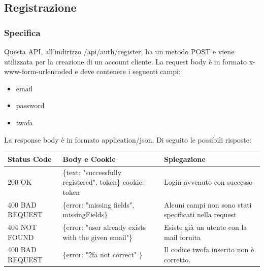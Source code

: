 \documentclass{report}
\begin{document}
\subsection{Registrazione}
\subsubsection*{Specifica}
Questa API, all'indirizzo /api/auth/register, ha un metodo POST e viene utilizzata per la creazione di un account cliente.
La request body è in formato x-www-form-urlencoded e deve contenere i seguenti campi:
\begin{itemize}
	\item email
	\item password
	\item twofa
\end{itemize}
La response body è in formato application/json. Di seguito le possibili risposte:
\begin{center} %
	\centering
	\begin{tabular}{ |p{4cm}|p{5cm}|p{4cm}| }
		\hline
		\centering Status Code & \qquad\quad Body e Cookie                                & \qquad\qquad Spiegazione                              \\ %
		\hline
		200 OK                 & \{text: "successfully registered", token\} cookie: token & Login avvenuto con successo                           \\
		\hline
		400 BAD REQUEST        & \{error: "missing fields", missingFields\}               & Alcuni campi non sono stati specificati nella request \\ %
		\hline
		404 NOT FOUND          & \{error: "user already exists with the given email"\}    & Esiste già un utente con la mail fornita              \\%
		\hline
		400 BAD REQUEST        & \{error: "2fa not correct" \}                            & Il codice twofa inserito non è corretto.              \\
		\hline
	\end{tabular}
\end{center}
\end{document}
